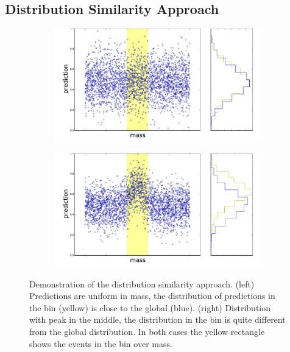 \subsection*{Distribution Similarity Approach}
\label{sec:similarity}

\begin{figure}[h]
		\centering
		\begin{subfigure}[b]{0.48\textwidth}
			\includegraphics[width=\textwidth]{graphs/bins_uniform_distribution.pdf}
		\end{subfigure}
		\begin{subfigure}[b]{0.48\textwidth}
			\includegraphics[width=\textwidth]{graphs/bins_nonuniform_distribution.pdf}
		\end{subfigure}
		\caption{Demonstration of the distribution similarity approach. (left) Predictions are uniform in mass, the distribution of predictions in the bin (yellow) is close to the global (blue). (right) Distribution with peak in the middle, the distribution in the bin is quite different from the global distribution. In both cases the yellow rectangle shows the events in the bin over mass.\label{fig:dsavisualization}}
\end{figure}
